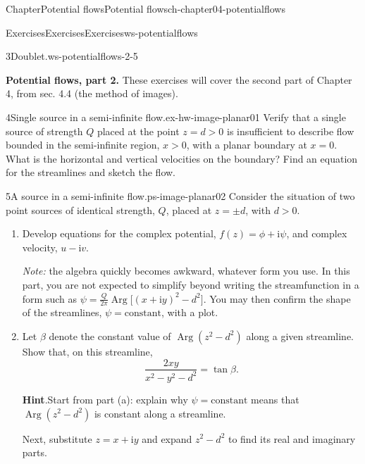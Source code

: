 \documentclass[oneside,10pt,]{book}
\newcommand{\blocktitlefont}{\relax}
\numberwithin{equation}{section}
\newcommand{\im}{\mathrm{i}}
\newcommand{\gt}{>}
\begin{document}
\begin{chapterptx}{Chapter}{Potential flows}{}{Potential flows}{}{}{ch-chapter04-potentialflows}
\begin{exercises-section}{Exercises}{Exercises}{}{Exercises}{}{}{ws-potentialflows}
\begin{exercisegroup}
\begin{divisionexerciseeg}{3}{Doublet.}{}{ws-potentialflows-2-5}
\begin{enumerate}[font=\bfseries,label=(\alph*),ref=\alph*]
\end{enumerate}%
\end{divisionexerciseeg}%
\end{exercisegroup}
\par\medskip\noindent
\par\medskip\noindent%
\textbf{Potential flows, part 2.}\space\space%
These exercises will cover the second part of Chapter 4, from sec. 4.4 (the method of images).%
\begin{exercisegroup}
\begin{divisionexerciseeg}{4}{Single source in a semi-infinite flow.}{}{ex-hw-image-planar01}%
Verify that a single source of strength \(Q\) placed at the point \(z = d > 0\) is insufficient to describe flow bounded in the semi-infinite region, \(x > 0\), with a planar boundary at \(x = 0\). What is the horizontal and vertical velocities on the boundary? Find an equation for the streamlines and sketch the flow.%
\end{divisionexerciseeg}%
\begin{divisionexerciseeg}{5}{A source in a semi-infinite flow.}{}{ps-image-planar02}%
Consider the situation of two point sources of identical strength, \(Q\), placed at \(z = \pm d\), with \(d \gt 0\).%
\begin{enumerate}[font=\bfseries,label=(\alph*),ref=\alph*]%
\item{}Develop equations for the complex potential, \(f(z) = \phi + \im \psi\), and complex velocity, \(u - \im v\).%
\par
\emph{Note:} the algebra quickly becomes awkward, whatever form you use. In this part, you are not expected to simplify beyond writing the streamfunction in a form such as \(\psi = \frac{Q}{2\pi}\operatorname{Arg}\big[(x + \im y)^2 - d^2\big]\). You may then confirm the shape of the streamlines, \(\psi = \textrm{constant}\), with a plot.%
\item{}Let \(\beta\) denote the constant value of \(\operatorname{Arg}(z^2 - d^2)\) along a given streamline. Show that, on this streamline,%
\begin{equation*}
\frac{2xy}{x^2 - y^2 - d^2} = \tan\beta.
\end{equation*}
%
\par\smallskip%
\noindent\textbf{\blocktitlefont Hint}.\hypertarget{ps-image-planar02-4-2}{}\quad{}Start from part (a): explain why \(\psi = \textrm{constant}\) means that \(\operatorname{Arg}(z^2 - d^2)\) is constant along a streamline.%
\par
Next, substitute \(z = x + \im y\) and expand \(z^2 - d^2\) to find its real and imaginary parts.%

\end{enumerate}
\end{divisionexerciseeg}
\end{exercisegroup}
\end{exercises-section}
\end{chapterptx}
\end{document}
